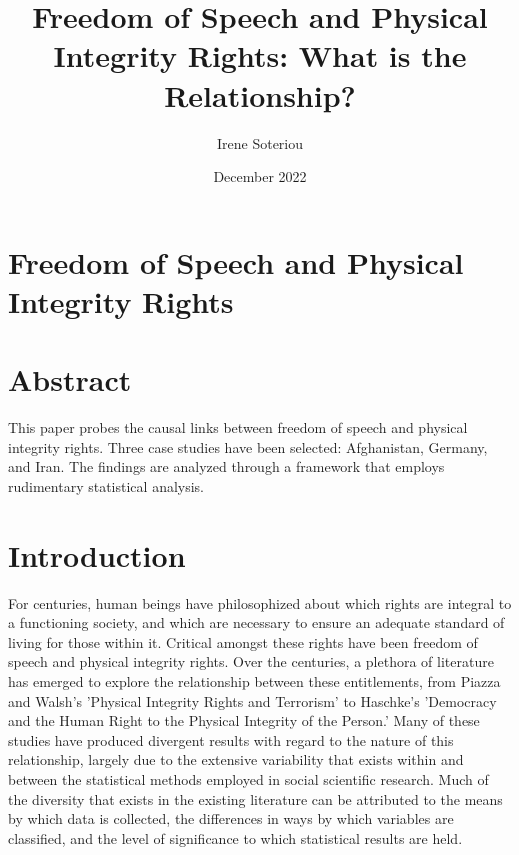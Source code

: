 \documentclass{article}
\title{Freedom of Speech and Physical Integrity Rights: What is the Relationship?}
\author{Irene Soteriou}
\date{December 2022}
\begin{document}
\maketitle

\section*{Freedom of Speech and Physical Integrity Rights}

\section{Abstract}
This paper probes the causal links between freedom of speech and physical integrity rights. Three case studies have been selected: Afghanistan, Germany, and Iran. The findings are analyzed through a framework that employs rudimentary statistical analysis. 

\section{Introduction}

For centuries, human beings have philosophized about which rights are integral to a functioning society, and which are necessary to ensure an adequate standard of living for those within it. Critical amongst these rights have been freedom of speech and physical integrity rights. Over the centuries, a plethora of literature has emerged to explore the relationship between these entitlements, from Piazza and Walsh’s ’Physical Integrity Rights and Terrorism’ to Haschke’s ’Democracy and the Human Right to the Physical Integrity of the Person.’ Many of these studies have produced divergent results with regard to the nature of this relationship, largely due to the extensive variability that exists within and between the statistical methods employed in social scientific research. Much of the diversity that exists in the existing literature can be attributed to the means by which data is collected, the differences in ways by which variables are classified, and the level of significance to which statistical results are held. 
\end{document}
